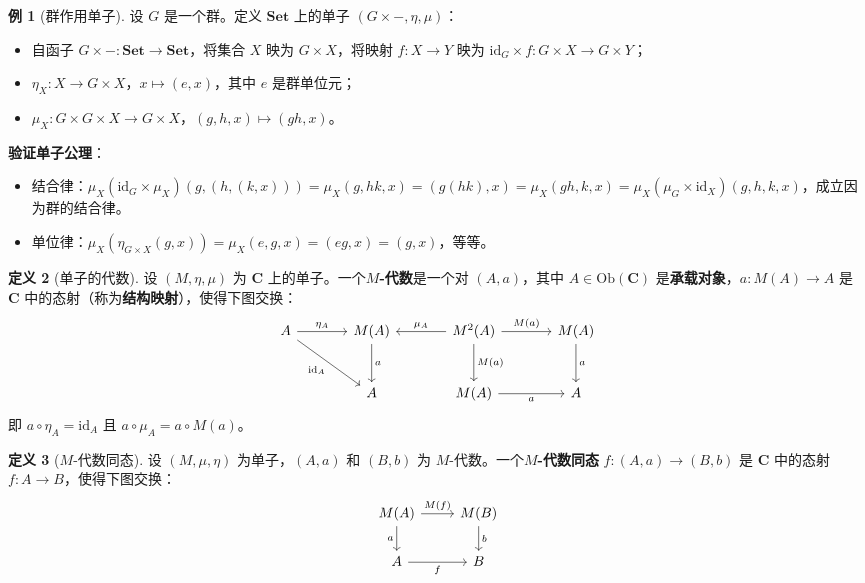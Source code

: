 \documentclass[12pt,a4paper]{ctexart}
\theoremstyle{definition}
\newtheorem{definition}{定义}[section]
\newtheorem{example}[definition]{例}
\newcommand{\cat}[1]{\mathbf{#1}}
\newcommand{\Set}{\cat{Set}}
\newcommand{\id}{\mathrm{id}}
\newcommand{\ob}[1]{\mathrm{Ob}(#1)}
\begin{document}
\begin{example}[群作用单子]\label{ex:group-monad}
设 $G$ 是一个群。定义 $\Set$ 上的单子 $(G\times-,\eta,\mu)$：
\begin{itemize}[nosep]
    \item 自函子 $G\times-:\Set\to\Set$，将集合 $X$ 映为 $G\times X$，将映射 $f:X\to Y$ 映为 $\id_G\times f:G\times X\to G\times Y$；
    \item $\eta_X:X\to G\times X$，$x\mapsto(e,x)$，其中 $e$ 是群单位元；
    \item $\mu_X:G\times G\times X\to G\times X$，$(g,h,x)\mapsto(gh,x)$。
\end{itemize}
\textbf{验证单子公理}：
\begin{itemize}
    \item 结合律：$\mu_X(\id_G\times\mu_X)(g,(h,(k,x)))=\mu_X(g,hk,x)=(g(hk),x)=\mu_X(gh,k,x)=\mu_X(\mu_G\times\id_X)(g,h,k,x)$，成立因为群的结合律。
    \item 单位律：$\mu_X(\eta_{G\times X}(g,x))=\mu_X(e,g,x)=(eg,x)=(g,x)$，等等。
\end{itemize}
\end{example}

\begin{definition}[单子的代数]\label{def:monad-algebra}
设 $(M,\eta,\mu)$ 为 $\cat C$ 上的单子。一个\textbf{$M$-代数}是一个对 $(A,a)$，其中 $A\in\ob{\cat C}$ 是\textbf{承载对象}，$a:M(A)\to A$ 是 $\cat C$ 中的态射（称为\textbf{结构映射}），使得下图交换：
\[
\begin{tikzcd}[column sep=large, row sep=large]
A \arrow[r,"\eta_A"] \arrow[dr,"\id_A"'] & M(A) \arrow[d,"a"] & M^2(A) \arrow[l,"\mu_A"'] \arrow[d,"M(a)"] \arrow[r,"M(a)"] & M(A) \arrow[d,"a"] \\
& A & M(A) \arrow[r,"a"'] & A
\end{tikzcd}
\]
即 $a\circ\eta_A=\id_A$ 且 $a\circ\mu_A=a\circ M(a)$。
\end{definition}

\begin{definition}[$M$-代数同态]\label{def:monad-alg-hom}
设 $(M,\mu,\eta)$ 为单子，$(A,a)$ 和 $(B,b)$ 为 $M$-代数。一个\textbf{$M$-代数同态} $f:(A,a)\to(B,b)$ 是 $\cat C$ 中的态射 $f:A\to B$，使得下图交换：
\begin{equation}\label{eq:alg-hom}
\begin{tikzcd}
M(A) \arrow[r,"M(f)"] \arrow[d,"a"'] & M(B) \arrow[d,"b"] \\
A \arrow[r,"f"'] & B
\end{tikzcd}
\end{equation}
\end{definition}
\end{document}

